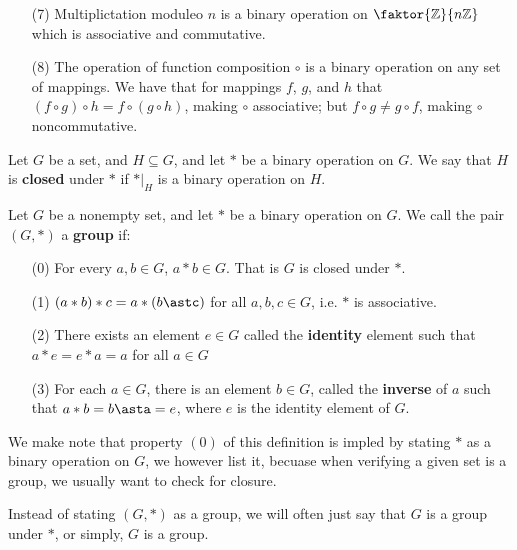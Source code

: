 \begin{example}
\begin{enumerate}
    \item[(7)] Multiplictation moduleo $n$ is a binary operation on
      $\faktor{\Z}{n\Z}$ which is associative and commutative.

    \item[(8)] The operation of function composition $\circ$ is a binary
      operation on any set of mappings. We have that for mappings $f$,
      $g$, and  $h$ that  $(f \circ g) \circ h=f \circ (g \circ h)$,
      making $\circ$ associative; but  $f \circ g \neq g \circ f$, making
      $\circ$ noncommutative.
  \end{enumerate}
\end{example}

\begin{definition}
  Let $G$ be a set, and  $H \subseteq G$, and let  $\ast$ be a binary
  operation on  $G$. We say that  $H$ is \textbf{closed} under $\ast$ if
  $\ast|_H$ is a binary operation on  $H$.
\end{definition}

\begin{definition}
  Let $G$ be a nonempty set, and let  $\ast$ be a binary operation on $G$. We
  call the pair  $(G,\ast)$ a \textbf{group} if:
  \begin{enumerate}
    \item[(0)] For every $a,b \in G$,  $a \ast b \in G$. That is  $G$ is closed
      under $\ast$.
    \item[(1)] $(a \ast b) \ast c=a \ast (b \astc)$ for all $a,b,c \in G$,
      i.e. $\ast$ is associative.

    \item[(2)] There exists an element $e \in G$ called the
      \textbf{identity} element such that  $a \ast e=e \ast a=a$ for all
      $a \in G$

    \item[(3)] For each $a \in G$, there is an element  $b \in G$, called
      the \textbf{inverse} of $a$ such that  $a \ast b=b \asta=e$, where
      $e$ is the identity element of $G$.
  \end{enumerate}
\end{definition}
\begin{remark}
  We make note that property $(0)$ of this definition is impled by stating
  $\ast$ as a binary operation on  $G$, we however list it, becuase when
  verifying a given set is a group, we usually want to check for closure.
\end{remark}
\begin{remark}
  Instead of stating $(G,\ast)$ as a group, we will often just say that $G$ is
  a group under  $\ast$, or simply,  $G$ is a group.
\end{remark}

